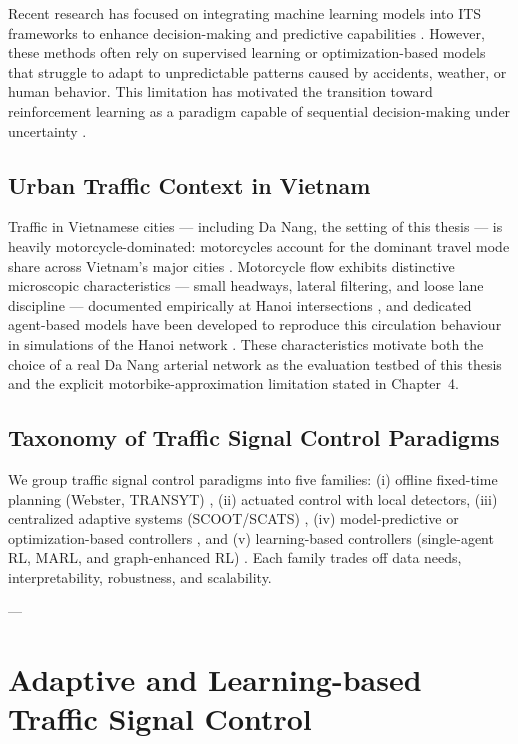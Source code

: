 \documentclass[12pt]{report} %
\begin{document}
Recent research has focused on integrating machine learning models into ITS frameworks to enhance decision-making and predictive capabilities \cite{ITS_ML2022,UrbanAI2023}. However, these methods often rely on supervised learning or optimization-based models that struggle to adapt to unpredictable patterns caused by accidents, weather, or human behavior. This limitation has motivated the transition toward reinforcement learning as a paradigm capable of sequential decision-making under uncertainty \cite{DRL_Transportation_2023,RL_Survey_Traffic_2023}.

\subsection*{Urban Traffic Context in Vietnam}
Traffic in Vietnamese cities --- including Da Nang, the setting of this thesis --- is heavily motorcycle-dominated: motorcycles account for the dominant travel mode share across Vietnam's major cities \cite{Ngoc_2021}. Motorcycle flow exhibits distinctive microscopic characteristics --- small headways, lateral filtering, and loose lane discipline --- documented empirically at Hanoi intersections \cite{Minh_2005}, and dedicated agent-based models have been developed to reproduce this circulation behaviour in simulations of the Hanoi network \cite{NguyenHo_2014}. These characteristics motivate both the choice of a real Da Nang arterial network as the evaluation testbed of this thesis and the explicit motorbike-approximation limitation stated in Chapter~4.

\subsection*{Taxonomy of Traffic Signal Control Paradigms}
We group traffic signal control paradigms into five families: (i) offline fixed-time planning (Webster, TRANSYT) \cite{Webster_1958,TRANSYT_2011}, (ii) actuated control with local detectors, (iii) centralized adaptive systems (SCOOT/SCATS) \cite{SCOOT2020,SCATS2021}, (iv) model-predictive or optimization-based controllers \cite{MPC_TSC_2022}, and (v) learning-based controllers (single-agent RL, MARL, and graph-enhanced RL) \cite{RL_Survey_Traffic_2023}. Each family trades off data needs, interpretability, robustness, and scalability.

---

\section{Adaptive and Learning-based Traffic Signal Control}
\end{document}
